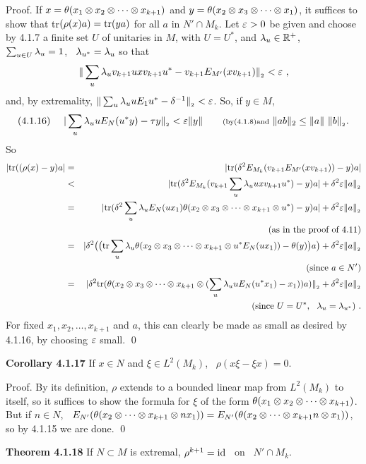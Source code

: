 \bigskip
{\sc Proof.} If $x=\theta(x_1\otimes x_2\otimes\dots\otimes
x_{k+1})$ and $y=\theta(x_2\otimes x_3\otimes\dots\otimes
x_1)$, it suffices to show that
tr$(\rho(x)a)={\bf\rm{tr}}(ya)$ for all $a$ in $N'\cap M_k$.
Let $\varepsilon > 0$ be given and choose by 4.1.7 a finite set $U$
of unitaries in $M$, with $U=U^*$, and $\lambda_u\in\Bbb R^+$,
$\sum_{u\in U}\lambda_u=1$, \ $\lambda_{u^*}=\lambda_u$ so that
$$
\|\sum_u \lambda_u v_{k+1} uxv_{k+1}u^* -
v_{k+1}E_{M'} (xv_{k+1})\|_{{}_2} < \varepsilon \ ,
$$
and, by extremality, $\|\sum_u \lambda_u uE_1u^*-\delta^{-1}\|_{{}_2} < \varepsilon$.
So, if $y\in M$,
$$
(4.1.16)\ \ \ \ |\sum_u \l_u uE_N(u^*y)-\tau y\|_{{}_2} < \e\|y\|
\qquad {\text{(by (4.1.8) and}} \ \|ab\|_2\leq \|a\| \
\|b\|_{{}_2}.  %
$$
So
\begin{eqnarray*}
|{\bf\rm{tr}}((\rho(x)-y)a| & =  & |{\bf\rm{tr}}(\delta^2 E_{M_k}(v_{k+1}E_{M'}(xv_{k+1}))-y)a| \\ 
& < & |{\bf\rm{tr}}(\delta^2 E_{M_k}(v_{k+1}\sum_u \lambda_u uxv_{k+1}u^*) -y)a| +\delta^2\varepsilon\|a\|_{{}_2} \\ 
& = & |{\bf\rm{tr}}(\delta^2 \sum_u \lambda_u E_N(ux_1)\theta(x_2\otimes x_3\otimes\dots\otimes x_{k+1}\otimes u^*)-y)a| +\delta^2\varepsilon\|a\|_{{}_2}\\ 
&  & \qquad {\mbox{(as in the proof of 4.11)}}\\
& = & |\delta^2 \big(\big({\bf\rm{tr}} \sum_u \lambda_u \theta
(x_2\otimes
x_3\otimes\dots\otimes x_{k+1}\otimes u^* E_N(u x_1))-\theta
(y)\big)a\big)+\delta^2\varepsilon\|a\|_{{}_2} \\
&  &  \qquad  {\mbox{(since}} \ a\in N')\\
&  = & |\delta^2{\bf\rm{tr}}(\theta(x_2\otimes 
x_3\otimes\dots\otimes x_{k+1}\otimes (\sum_u
\lambda_u uE_N(u^*x_1)-x_1))a)\|_{{}_2} +\delta^2\varepsilon\|a\|_{{}_2} \\
&  &  \qquad  {\mbox{(since}} \ U=U^*, \ \ \lambda_u=\lambda_{u^*}) \ .
\end{eqnarray*}
For fixed $x_1,x_2,\dots ,x_{k+1}$ and $a$, this can clearly be
made as small as desired by 4.1.16, by choosing $\varepsilon$ small. \qed

\medskip
{\bf Corollary 4.1.17} If $x\in N$ and $\xi\in L^2(M_k)$,
\ $\rho(x\xi-\xi x)=0$.

\bigskip
{\sc Proof.} By its definition, $\rho$ extends to a bounded linear
map from $L^2(M_k)$ to itself, so it suffices to show the formula
for $\xi$ of the form $\theta(x_1\otimes
x_2\otimes\dots\otimes x_{k+1})$. But if $n\in N$, \
$E_{N'}(\theta(x_2\otimes\dots\otimes x_{k+1}\otimes nx_1))=
E_{N'}(\theta(x_2\otimes\dots\otimes x_{k+1}n\otimes x_1))$,  so by
4.1.15 we are done. \qed

\medskip
{\bf Theorem 4.1.18}
If $N \subset M$ is extremal,
$\rho^{k+1}={\bf\rm{id}}$ \ on \ $N'\cap M_k$.

